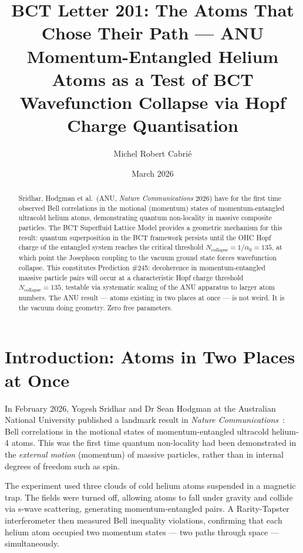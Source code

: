\documentclass[aps,prl,twocolumn,showpacs,superscriptaddress]{revtex4-2}
\begin{document}
\title{BCT Letter 201: The Atoms That Chose Their Path ---
ANU Momentum-Entangled Helium Atoms as a Test of BCT
Wavefunction Collapse via Hopf Charge Quantisation}

\author{Michel Robert Cabri\'{e}}
\date{March 2026}

\begin{abstract}
Sridhar, Hodgman et al.\ (ANU, \textit{Nature Communications} 2026)
have for the first time observed Bell correlations in the motional
(momentum) states of momentum-entangled ultracold helium atoms,
demonstrating quantum non-locality in massive composite particles.
The BCT Superfluid Lattice Model provides a geometric mechanism for
this result: quantum superposition in the BCT framework persists
until the OHC Hopf charge of the entangled system reaches the
critical threshold $N_\mathrm{collapse} = 1/\alpha_0 = 135$, at which
point the Josephson coupling to the vacuum ground state forces
wavefunction collapse. This constitutes Prediction \#245: decoherence
in momentum-entangled massive particle pairs will occur at a
characteristic Hopf charge threshold $N_\mathrm{collapse} = 135$,
testable via systematic scaling of the ANU apparatus to larger
atom numbers. The ANU result --- atoms existing in two places at once
--- is not weird. It is the vacuum doing geometry. Zero free
parameters.
\end{abstract}

\maketitle

\section{Introduction: Atoms in Two Places at Once}

In February 2026, Yogesh Sridhar and Dr Sean Hodgman at the Australian
National University published a landmark result in \textit{Nature
Communications}~\cite{Sridhar2026}: Bell correlations in the motional
states of momentum-entangled ultracold helium-4 atoms. This was the
first time quantum non-locality had been demonstrated in the
\textit{external motion} (momentum) of massive particles, rather
than in internal degrees of freedom such as spin.

The experiment used three clouds of cold helium atoms suspended in
a magnetic trap. The fields were turned off, allowing atoms to fall
under gravity and collide via s-wave scattering, generating
momentum-entangled pairs. A Rarity-Tapster interferometer then
measured Bell inequality violations, confirming that each helium
atom occupied two momentum states --- two paths through space ---
simultaneously.
\end{document}
